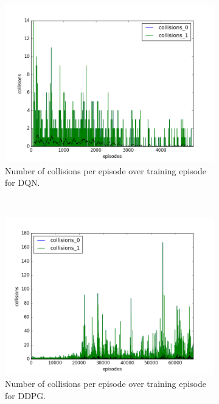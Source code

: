 \begin{figure}[h]
  \begin{subfigure}[h]{\figscale\linewidth}
    \includegraphics[trim=10 10 10 10,clip,width=\linewidth]
    {../results/dqn_1vs1/collisions.png}
    \caption{Number of collisions per episode over training episode for DQN.}
    \label{fig:dqn-1vs1-collisions}
  \end{subfigure}
  ~
  \begin{subfigure}[h]{\figscale\linewidth}
    \includegraphics[trim=10 10 10 10,clip,width=\linewidth]
    {../results/ddpg_1vs1/collisions.png}
    \caption{Number of collisions per episode over training episode for DDPG.}
    \label{fig:ddpg-1vs1-collisions}
  \end{subfigure}
  ~
  \begin{subfigure}[h]{\figscale\linewidth}

\end{subfigure}
\end{figure}
